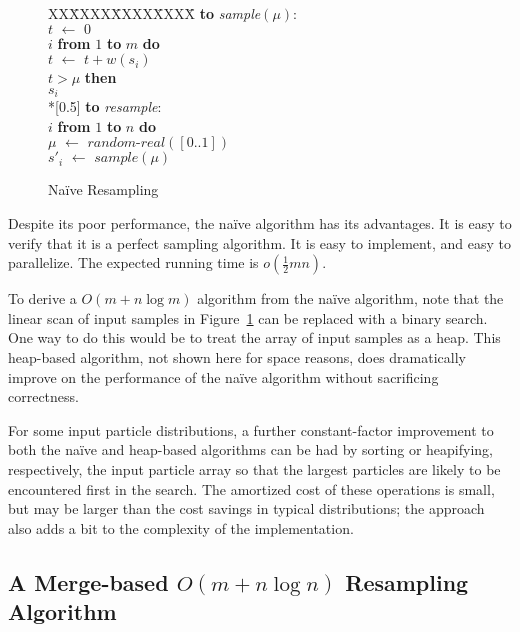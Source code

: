\documentclass{article}
\newcommand{\asgn}{\,\,\leftarrow\,\,}
\newcommand{\newcode}{\\*[0.5\baselineskip]}
\begin{document}
  \begin{figure}
    \centering
    \begin{minipage}[b]{\linewidth}
      \begin{tabbing}
      XX\=XXXX\=XXXX\=XXXX\=\kill
      {\bf to} {\it sample}$(\mu)$: \\
      \>$t \asgn 0$ \\
       $i$ {\bf from} $1$ {\bf to} $m$ {\bf do} \\
      \>\>$t \asgn t + w(s_i)$ \\
      \> $t > \mu$ {\bf then} \\
      \>\> $s_i$ \newcode
      {\bf to} {\it resample}: \\
       $i$ {\bf from} $1$ {\bf to} $n$ {\bf do} \\
      \>\>$\mu \asgn \textit{random-real}([0..1])$ \\
      \>\>$s'_i \asgn sample(\mu)$
      \end{tabbing}
    \end{minipage}
    \caption{Na\"ive Resampling}\label{fig:omn}
  \end{figure}

  Despite its poor performance, the na\"ive algorithm has
  its advantages.  It is easy to verify that it is a perfect
  sampling algorithm.  It is easy to implement, and easy to
  parallelize.  The expected running time is
  $o(\frac{1}{2}mn)$.

  To derive a $O(m + n \log m)$ algorithm from the na\"ive
  algorithm, note that the linear scan of input samples in
  Figure~\ref{fig:omn} can be replaced with a binary
  search.  One way to do this would be to treat the array of
  input samples as a heap.  This heap-based algorithm, not
  shown here for space reasons, does dramatically improve on
  the performance of the na\"ive algorithm without
  sacrificing correctness.

  For some input particle distributions, a further
  constant-factor improvement to both the na\"ive and
  heap-based algorithms can be had by sorting or heapifying,
  respectively, the input particle array so that the largest
  particles are likely to be encountered first in the
  search.  The amortized cost of these operations is small,
  but may be larger than the cost savings in typical
  distributions; the approach also adds a bit to the
  complexity of the implementation.

\subsection{A Merge-based $O(m + n \log n)$ Resampling Algorithm}\label{sec:merge}
\end{document}
